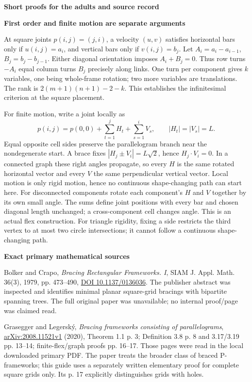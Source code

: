 \documentclass[letterpaper,11pt]{article}
\newcommand{\titleline}[1]{\par{\large\bfseries #1}\par}
\newcommand{\sub}[1]{\par\textbf{#1}\par}
\begin{document}
\newpage
\fontsize{11}{13.6}\selectfont
\titleline{Short proofs for the adults and source record}
\sub{First order and finite motion are separate arguments}
At square joints $p(i,j)=(j,i)$, a velocity $(u,v)$ satisfies horizontal bars only if $u(i,j)=a_i$, and vertical bars only if $v(i,j)=b_j$. Let $A_i=a_i-a_{i-1}$, $B_j=b_j-b_{j-1}$. Either diagonal orientation imposes $A_i+B_j=0$. Thus row turns $-A_i$ equal column turns $B_j$ precisely along links. One turn per component gives $k$ variables, one being whole-frame rotation; two more variables are translations. The rank is $2(m+1)(n+1)-2-k$. This establishes the infinitesimal criterion at the square placement.

For finite motion, write a joint locally as
\[
p(i,j)=p(0,0)+\sum_{t=1}^{j}H_t+\sum_{s=1}^{i}V_s,\qquad |H_t|=|V_s|=L.
\]
Equal opposite cell sides preserve the parallelogram branch near the nondegenerate start. A brace fixes $|H_j\pm V_i|=L\sqrt2$, hence $H_j\cdot V_i=0$. In a connected graph these right angles propagate, so every $H$ is the same rotated horizontal vector and every $V$ the same perpendicular vertical vector. Local motion is only rigid motion, hence no continuous shape-changing path can start here. For disconnected components rotate each component's $H$ and $V$ together by its own small angle. The sums define joint positions with every bar and chosen diagonal length unchanged; a cross-component cell changes angle. This is an actual flex construction. For triangle rigidity, fixing a side restricts the third vertex to at most two circle intersections; it cannot follow a continuous shape-changing path.

\sub{Exact primary mathematical sources}
Bolker and Crapo, \emph{Bracing Rectangular Frameworks. I}, SIAM J. Appl. Math. 36(3), 1979, pp. 473--490, \href{https://epubs.siam.org/doi/abs/10.1137/0136036}{DOI 10.1137/0136036}. The publisher abstract was inspected and identifies minimal planar square-grid bracings with bipartite spanning trees. The full original paper was unavailable; no internal proof/page was claimed read.

Grasegger and Legersk\'y, \emph{Bracing frameworks consisting of parallelograms}, \href{https://arxiv.org/abs/2008.11521v1}{arXiv:2008.11521v1} (2020), Theorem 1.1 p. 3; Definition 3.8 p. 8 and 3.17/3.19 pp. 13--14; finite-flex/graph proofs pp. 16--17. Those pages were read in the local downloaded primary PDF. The paper treats the broader class of braced P-frameworks; this guide uses a separately written elementary proof for complete square grids only. Its p. 17 explicitly distinguishes grids with holes.
\end{document}
